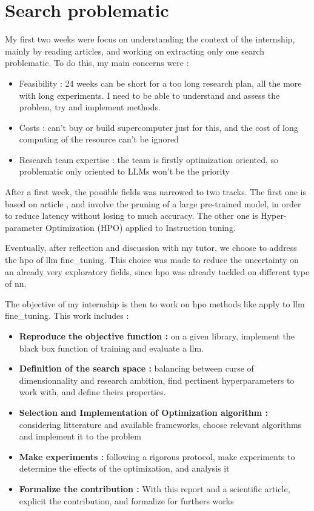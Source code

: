 \section{Search problematic}
My first two weeks were focus on understanding the context of the internship, mainly by reading articles, and working on extracting only one search problematic. To do this, my main concerns were : 
\begin{itemize}
    \item Feasibility : 24 weeks can be short for a too long research plan, all the more with long experiments. I need to be able to understand and assess the problem, try and implement methods.
    \item Costs : can't buy or build supercomputer just for this, and the cost of long computing of the resource can't be ignored 
    \item Research team expertise : the team is firstly optimization oriented, so problematic only oriented to LLMs won't be the priority
\end{itemize}

After a first week, the possible fields was narrowed to two tracks. The first one is based on article \cite{klein_structural_2023}, and involve the pruning of a large pre-trained model, in order to reduce latency without losing to much accuracy. The other one \cite{tribes_hyperparameter_2024} is Hyper-parameter Optimization (HPO) applied to Instruction tuning.  

Eventually, after reflection and discussion with my tutor, we choose to address the \acrshort{hpo} of \acrshort{llm} \gls{fine_tuning}. This choice was made to reduce the uncertainty on an already very exploratory fields, since \acrshort{hpo} was already tackled on different type of \acrshort{nn}. 

The objective of my internship is then to work on \acrshort{hpo} methods like apply to \acrshort{llm} \gls{fine_tuning}. This work includes : 
\begin{itemize}
    \item \textbf{Reproduce the objective function :} on a given library, implement the black box function of training and evaluate a \acrshort{llm}.
    \item \textbf{Definition of the search space : }balancing between curse of dimensionnality and research ambition, find pertinent \glspl{hyperparameter} to work with, and define theirs properties.
    \item \textbf{Selection and Implementation of Optimization algorithm :} considering litterature and available frameworks, choose relevant algorithms and implement it to the problem
    \item \textbf{Make experiments :} following a rigorous protocol, make experiments to determine the effects of the optimization, and analysis it
    \item \textbf{Formalize the contribution :} With this report and a scientific article, explicit the contribution, and formalize for furthers works
\end{itemize}

